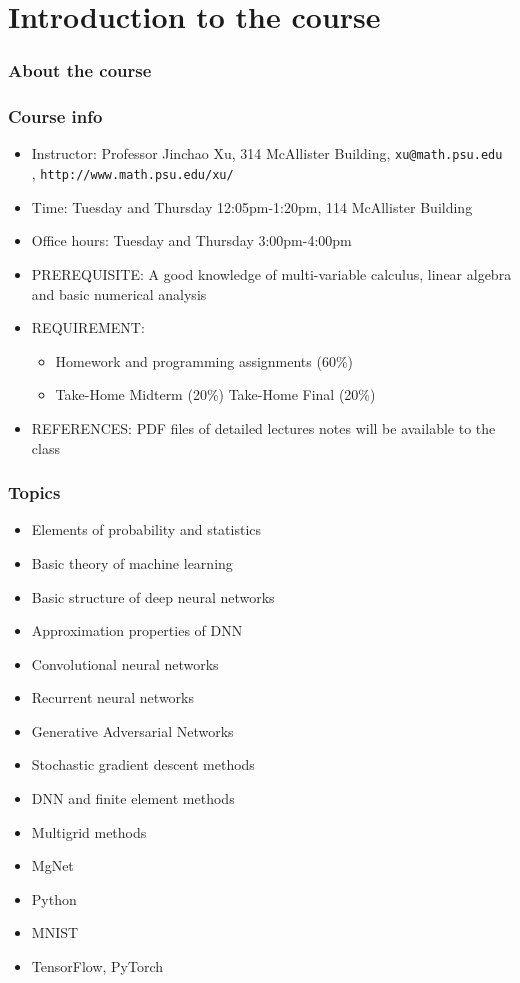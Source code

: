  \chapter{Introduction to the course}
\subsection{About the course}
\subsection{Course info}
\begin{itemize}
\item Instructor:  Professor Jinchao Xu, 314 McAllister Building, {\color{blue}\tt xu@math.psu.edu }, {\color{blue}\tt http://www.math.psu.edu/xu/}
\item Time: Tuesday and Thursday 12:05pm-1:20pm, 114 McAllister Building
\item Office hours: Tuesday and Thursday 3:00pm-4:00pm
\item PREREQUISITE:
A good knowledge of multi-variable calculus, linear
algebra and basic numerical analysis

\item REQUIREMENT: $\quad$

  \begin{itemize}
  \item Homework and programming assignments  (60\%)
\item Take-Home Midterm (20\%) Take-Home Final (20\%)
  \end{itemize}
\item REFERENCES: PDF files of detailed lectures notes will be available to
the  class
\end{itemize}


\subsection{Topics}
\begin{itemize}
\item Elements of probability and statistics
\item Basic theory of machine learning
\item Basic structure of deep neural networks
\item Approximation properties of DNN
\item Convolutional neural networks
\item Recurrent neural networks
\item Generative Adversarial Networks
\item Stochastic gradient descent methods
\item DNN and finite element methods
\item Multigrid methods
\item MgNet
\item Python
\item MNIST
\item TensorFlow, PyTorch
\end{itemize}


